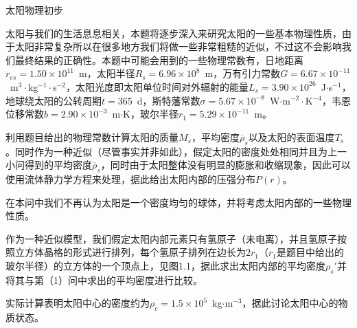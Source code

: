 \documentclass[exam]{cphos}
\begin{document}
\begin{problem}[40]{太阳物理初步}

\begin{problemstatement}
太阳与我们的生活息息相关，本题将逐步深入来研究太阳的一些基本物理性质，由于太阳非常复杂所以在很多地方我们将做一些非常粗糙的近似，不过这不会影响我们最终结果的正确性。本题中可能会用到的一些物理常数有，日地距离$r_{es}=1.50\times 10^{11}$~m，太阳半径$R_s=6.96\times 10^{8}$~m，万有引力常数$G=6.67\times 10^{-11}$~m$^3\cdot$kg$^{-1}\cdot$s$^{-2}$，太阳光度即太阳单位时间对外辐射的能量$L_s=3.90\times 10^{26}$~J$\cdot$s$^{-1}$，地球绕太阳的公转周期$t=365$~d，斯特藩常数$\sigma=5.67\times 10^{-8}$~W$\cdot$m$^{-2}\cdot$K$^{-4}$，韦恩位移常数$b=2.90\times 10^{-3}$~m$\cdot$K，玻尔半径$r_1=5.29\times 10^{-11}$~m。

利用题目给出的物理常数计算太阳的质量$M_s$，平均密度$\overline{\rho}_s$以及太阳的表面温度$T_s$。同时作为一种近似（尽管事实并非如此），假定太阳的密度处处相同并且为上一小问得到的平均密度$\overline{\rho}_s$，同时由于太阳整体没有明显的膨胀和收缩现象，因此可以使用流体静力学方程来处理，据此给出太阳内部的压强分布$P(r)$。

在本问中我们不再认为太阳是一个密度均匀的球体，并将考虑太阳内部的一些物理性质。

作为一种近似模型，我们假定太阳内部元素只有氢原子（未电离），并且氢原子按照立方体晶格的形式进行排列，每个氢原子排列在边长为$2r_1$（$r_1$是题目中给出的玻尔半径）的立方体的一个顶点上，见图1.1，据此求出太阳内部的平均密度$\rho_s'$并将其与第（1）问中求出的平均密度进行比较。

实际计算表明太阳中心的密度约为$\rho_c=1.5\times 10^5$~kg$\cdot$m$^{-3}$，据此讨论太阳中心的物质状态。
\end{problemstatement}

\begin{solution}


\end{solution}
\end{problem}
\end{document}
